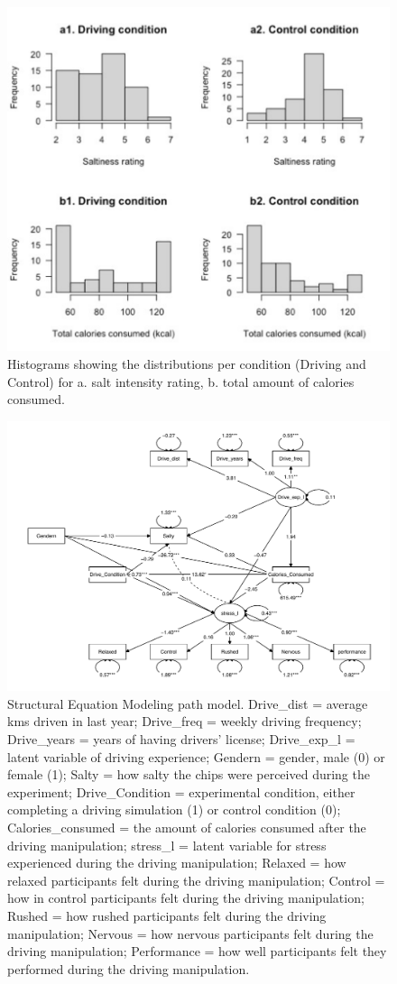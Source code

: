 \documentclass[authordate, empirical]{jote-new-article}
\begin{document}
\begin{figure}
  \centering
  \includegraphics[width=.7\textwidth]{media/image5.pdf}
  \caption{Histograms showing the distributions per condition (Driving and Control) for a. salt intensity rating, b. total amount of calories consumed.}

  \label{fig:rId27}

\end{figure}


\begin{figure}

  \includegraphics[width=\textwidth]{media/image6.pdf}
  \caption{Structural Equation Modeling path model. Drive\_dist = average kms driven in last year; Drive\_freq = weekly driving frequency; Drive\_years = years of having drivers’ license; Drive\_exp\_l = latent variable of driving experience; Gendern = gender, male (0) or female (1); Salty = how salty the chips were perceived during the experiment; Drive\_Condition = experimental condition, either completing a driving simulation (1) or control condition (0); Calories\_consumed = the amount of calories consumed after the driving manipulation; stress\_l = latent variable for stress experienced during the driving manipulation; Relaxed = how relaxed participants felt during the driving manipulation; Control = how in control participants felt during the driving manipulation; Rushed = how rushed participants felt during the driving manipulation; Nervous = how nervous participants felt during the driving manipulation; Performance = how well participants felt they performed during the driving manipulation.}
  \label{fig:rId28}
\end{figure}
\end{document}
